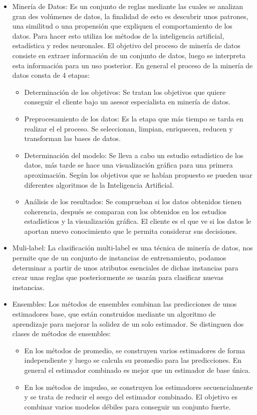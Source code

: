 \begin{itemize}
\begin{itemize}
	\end{itemize}
\item Minería de Datos: Es un conjunto de reglas mediante las cuales se analizan gran des volúmenes de datos, la finalidad de esto es descubrir unos patrones, una similitud o una propensión que expliquen el comportamiento de los datos.
Para hacer esto utiliza los métodos de la inteligencia artificial, estadística y redes neuronales.
El objetivo del proceso de minería de datos consiste en extraer información de un conjunto de datos, luego se interpreta esta información para un uso posterior.
En general el proceso de la minería de datos consta de 4 etapas:
	\begin{itemize}
		\item Determinación de los objetivos: Se tratan los objetivos que quiere conseguir el cliente bajo un asesor especialista en minería de datos.
		\item Preprocesamiento de los datos: Es la etapa que más tiempo se tarda en realizar el el proceso. Se seleccionan, limpian, enriquecen, reducen y transforman las bases de datos. 
		\item Determinación del modelo: Se lleva a cabo un estudio estadístico de los datos, más tarde se hace una visualización gráfica para una primera aproximación. Según los objetivos que se habían propuesto se pueden usar diferentes algoritmos de la Inteligencia Artificial.
		\item Análisis de los resultados: Se comprueban si los datos obtenidos tienen coherencia, después se comparan con los obtenidos en los estudios estadísticos y la visualización gráfica. El cliente es el que ve si los datos le aportan nuevo conocimiento que le permita considerar sus decisiones.
	\end{itemize}

\item Muli-label: La clasificación multi-label es una técnica de minería de datos, nos permite que de un conjunto de instancias de entrenamiento, podamos determinar a partir de unos atributos esenciales de dichas instancias para crear unas reglas que posteriormente se usarán para clasificar nuevas instancias.    

\item Ensembles: Los métodos de ensembles combinan las predicciones de unos estimadores base, que están construidos mediante un algoritmo de aprendizaje para mejorar la solidez de un solo estimador.
Se distinguen dos clases de métodos de ensembles:
	\begin{itemize}
		\item En los métodos de promedio, se construyen varios estimadores de forma independiente y luego se calcula su promedio para las predicciones. En general el estimador combinado es mejor que un estimador de base única.
		\item En los métodos de impulso, se construyen los estimadores secuencialmente y se trata de reducir el sesgo del estimador combinado. El objetivo es combinar varios modelos débiles para conseguir un conjunto fuerte.
	\end{itemize}

\end{itemize}
